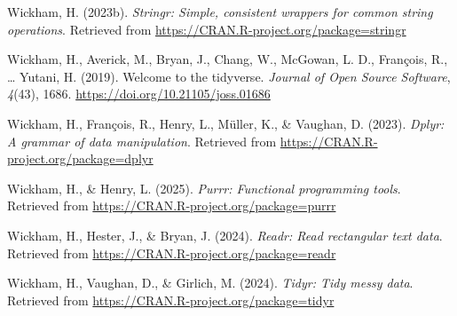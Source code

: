 \documentclass[
  man,floatsintext]{apa6}
\newlength{\cslhangindent}
\newenvironment{CSLReferences}[2] %
 {\begin{list}{}{%
  \setlength{\itemindent}{0pt}
  \setlength{\leftmargin}{0pt}
  \setlength{\parsep}{0pt}
  \ifodd #1
   \setlength{\leftmargin}{\cslhangindent}
   \setlength{\itemindent}{-1\cslhangindent}
  \fi
  \setlength{\itemsep}{#2\baselineskip}}}
 {\end{list}}
\begin{document}
\begin{CSLReferences}{1}{0}
Wickham, H. (2023b). \emph{Stringr: Simple, consistent wrappers for common string operations}. Retrieved from \url{https://CRAN.R-project.org/package=stringr}

Wickham, H., Averick, M., Bryan, J., Chang, W., McGowan, L. D., François, R., \ldots{} Yutani, H. (2019). Welcome to the {tidyverse}. \emph{Journal of Open Source Software}, \emph{4}(43), 1686. \url{https://doi.org/10.21105/joss.01686}

Wickham, H., François, R., Henry, L., Müller, K., \& Vaughan, D. (2023). \emph{Dplyr: A grammar of data manipulation}. Retrieved from \url{https://CRAN.R-project.org/package=dplyr}

Wickham, H., \& Henry, L. (2025). \emph{Purrr: Functional programming tools}. Retrieved from \url{https://CRAN.R-project.org/package=purrr}

Wickham, H., Hester, J., \& Bryan, J. (2024). \emph{Readr: Read rectangular text data}. Retrieved from \url{https://CRAN.R-project.org/package=readr}

Wickham, H., Vaughan, D., \& Girlich, M. (2024). \emph{Tidyr: Tidy messy data}. Retrieved from \url{https://CRAN.R-project.org/package=tidyr}

\end{CSLReferences}
\end{document}
